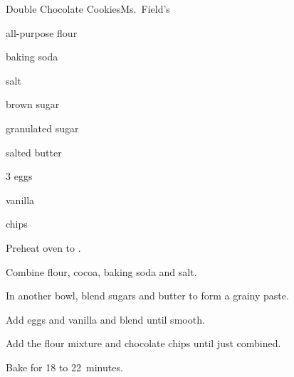 \begin{recipe}{Double Chocolate Cookies}{Ms.~Field's}{}

\begin{ingredients}
\item \C{2\quarter} all-purpose flour
\item \C{\half} 
\item \tp{\half} baking soda
\item \tp{\quarter} salt
\item {} brown sugar
\item \C{\threequarter} granulated sugar
\item {} salted butter
\item 3 eggs
\item {} vanilla
\item {}  chips
\end{ingredients}

\begin{directions}
\item Preheat oven to .
\item Combine flour, cocoa, baking soda and salt.
\item In  another bowl, blend sugars and butter to form a grainy paste.
\item Add eggs and vanilla and blend until smooth.
\item Add the flour mixture and chocolate chips until just combined.
\item Bake for 18 to 22~minutes.
\end{directions}
\end{recipe}
